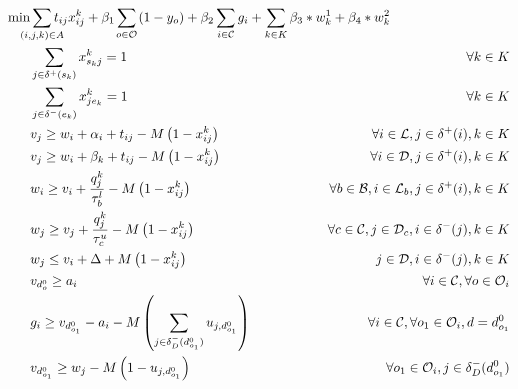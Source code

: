 \documentclass{article}
\begin{document}
\begin{alignat}{3}
\label{mod:obj}   \min &  \smashoperator{ \sum_{ \substack{(i,j,k) \in A} }} {t_{ij}x^{k}_{ij}} + \beta_1\smashoperator{\sum_{ o \in \mathcal{O}}}{  \left(1-y_o\right)} \hspace{-0mm}  + \beta_2 \smashoperator{ \sum_{i \in \mathcal{C} } } { g_i  } +  \sum_{k \in K}{\beta_3* w^{1}_k } + \beta_4 *{ w^{2}_k }&\\
    \label{mod:c1} &\sum_{j \in \delta^{+}(s_k) }{x^k_{s_kj}} = 1   &  \forall k \in K  \\
    \label{mod:c2} &\sum_{j \in \delta^{-}(e_k)}{x^k_{je_k}} = 1   &  \forall k \in K\\
    \label{mod:c3} & v_j \geq  w_i + \alpha_{i} + t_{ij} - M\left(1-x^{k}_{ij}\right)  & \hspace{-20mm} \forall i \in \mathcal{L}, j \in \delta^{+}(i),  k \in K \\
    \label{mod:c4}  & v_j \geq  w_i + \beta_{k} + t_{ij} - M\left(1-x^{k}_{ij}\right) & \hspace{-20mm} \forall i \in \mathcal{D}, j \in \delta^{+}(i), k \in K \\
    \label{mod:c5} & w_{i} \geq v_{i}  + \frac{q^k_j}{\tau^l_b} -M\left(1- x^{k}_{ij}\right) &  \hspace{-20mm} \forall  b \in \mathcal{B},  i \in \mathcal{L}_{b},  j \in \delta^{+}(i), k \in K \\
    \label{mod:c6} &          w_{j} \geq v_{j}  + {  \frac{q^k_j}{\tau^u_c} -M\left(1- x^{k}_{ij}\right) } & \hspace{-20mm}  \forall c \in  \mathcal{C}, j \in \mathcal{D}_{c}, i \in \delta^{-}(j),  k \in K \\
    \label{mod:c7} &         w_{j} \leq v_{i}  + \Delta + M\left(1- x^{k}_{ij}\right) & \hspace{-20mm}   j \in \mathcal{D},  i \in \delta^{-}(j),  k \in K \\
    \label{mod:c8}  &  v_{d^0_{o}} \geq a_i  & \hspace{-20mm} \forall  i \in \mathcal{C}, \forall o \in \mathcal{O}_i\\
    \label{mod:c9} & g_{i} \geq v_{d^0_{o_1}} - a_i - M\left(  \sum_{ j \in \delta^{-}_{D}(d^0_{o_1})  }{u_{j,d^0_{o_1}}}\right)  & \hspace{-20mm}  \forall  i \in \mathcal{C}, \forall o_1 \in \mathcal{O}_i, d=d^0_{o_1} \\
     \label{mod:c101} & v_{d^0_{o_1}} \geq w_j - M\left(1- u_{j,d^0_{o_1}}\right)  & \hspace{-40mm}    \forall o_1 \in \mathcal{O}_i,  j \in \delta_{D}^{-}(d^0_{o_1})  \\

\end{alignat}
\end{document}

